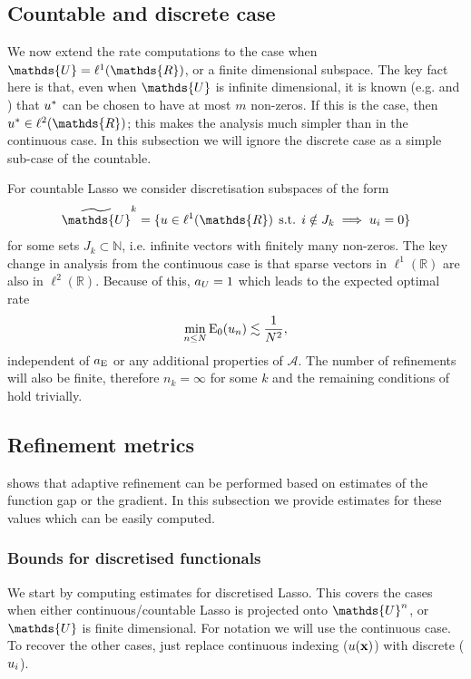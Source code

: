 \documentclass[10pt,a4paper,onecolumn]{article}
\numberwithin{equation}{section}
\let\F\mathds\let\C\mathcal\newcommand{\R}{\F{R}}\newcommand{\A}{\C{A}}
\newcommand{\op}[1]{\operatorname{#1}}\newcommand{\overtext}[2]{\stackrel{\text{#1}}{#2}}
\DeclareMathOperator{\st}{\;s.t.\;}\DeclareMathOperator{\as}{\;a.s.\;}\renewcommand{\epsilon}{\varepsilon}
\renewcommand{\vec}{\mathbf}
\newcommand{\UCmath}[1]{%
	\begingroup
	\ucmathlist\uppercase\expandafter{#1}%
	\endgroup
}
\newcommand{\ucmathlist}{%
	\def\alpha{\mathrm{A}}%
	\def\beta{\mathrm{B}}%
	\let\gamma=\Gamma
	\let\delta=\Delta
	\def\epsilon{\mathrm{E}}%
	\def\varepsilon{\mathrm{E}}%
	\def\zeta{\mathrm{Z}}%
	\def\eta{\mathrm{H}}%
	\let\theta=\Theta
	\let\vartheta=\Theta
	\def\iota{\mathrm{I}}%
	\def\kappa{\mathrm{K}}%
	\let\lambda=\Lambda
	\def\mu{\mathrm{M}}%
	\def\nu{\mathrm{N}}%
	\let\xi=\Xi
	\let\pi=\Pi
	\let\varpi=\Pi
	\def\rho{\mathrm{P}}%
	\def\varrho{\mathrm{P}}%
	\let\sigma=\Sigma
	\def\tau{\mathrm{T}}%
	\let\upsilon=\Upsilon
	\let\phi=\Phi
	\let\varphi=\Phi
	\def\chi{\mathrm{X}}%
	\let\psi=\Psi
	\let\omega=\Omega
}
\newcommand{\caps}[1]{\UCmath{#1}}
\newcommand*{\Func}[1]{%
	\IfEqCase{#1}{%
		{0}{\op{E}}%
		{1}{\op{F}}%
		{2}{\op{G}}%
		{3}{\op{H}}%
	}[\op{F}#1]%
}
\newcommand*{\varf}[1]{%
	\IfEqCase{#1}{%
		{0}{u}%
		{1}{v}%
		{2}{w}%
	}[u#1]%
}
\newcommand*{\spcf}[1]{%
	\IfEqCase{#1}{%
		{0}{\F{U}}%
		{1}{\F{V}}%
		{2}{\F{W}}%
	}[\F{U}#1]%
}
\newcommand*{\varx}[1]{%
	\IfEqCase{#1}{%
		{0}{x}%
		{1}{y}%
		{2}{z}%
		{3}{r}%
	}[x#1]%
}
\newcommand*{\vars}[1]{%
	\IfEqCase{#1}{%
		{0}{\alpha}%
		{1}{\beta}%
		{2}{\gamma}%
		{3}{a}%
		{4}{b}%
		{5}{c}%
	}[k#1]%
}
\newcommand*{\Varx}[1]{\caps{\varx{#1}}}
\newcommand*{\Varf}[1]{\caps{\varf{#1}}}
\newcommand*{\vvarx}[1]{\vec{\varx{#1}}}\newcommand*{\vVarx}[1]{\vec{\Varx{#1}}}
\begin{document}
\subsection{Countable and discrete case}
We now extend the rate computations to the case when $\spcf0=\ell^1(\R)$, or a finite dimensional subspace. The key fact here is that, even when $\spcf0$ is infinite dimensional, it is known (e.g. \cite[Theorem 2]{Unser2016} and \cite[Corollary 2]{Boyer2019}) that $\varf0^*$ can be chosen to have at most $m$ non-zeros. If this is the case, then $\varf0^*\in \ell^2(\R)$; this makes the analysis much simpler than in the continuous case. In this subsection we will ignore the discrete case as a simple sub-case of the countable.

For countable Lasso we consider discretisation subspaces of the form 
$$\tilde{\spcf0}^k = \{\varf0\in \ell^1(\R) \st i\notin J_k\implies \varf0_i=0\}$$ for some sets $J_k\subset\F N$, i.e. infinite vectors with finitely many non-zeros. The key change in analysis from the continuous case is that sparse vectors in $\ell^1(\R)$ are also in $\ell^2(\R)$. Because of this, $\vars3_{\Varf0}=1$ which leads to the expected optimal rate
$$\min_{n\leq N} \Func0_0(\varf0_n) \lesssim \frac{1}{N^2},$$
independent of $\vars3_{\Func0}$ or any additional properties of $\A$. The number of refinements will also be finite, therefore $n_k=\infty$ for some $k$ and the remaining conditions of  hold trivially.

\subsection{Refinement metrics}\label{sec:ca: Lasso gap and gradient}
 shows that adaptive refinement can be performed based on estimates of the function gap or the gradient. In this subsection we provide estimates for these values which can be easily computed.

\subsubsection{Bounds for discretised functionals}\label{sec:ca: bound discrete}
We start by computing estimates for discretised Lasso. This covers the cases when either continuous/countable Lasso is projected onto $\spcf0^n$, or $\spcf0$ is finite dimensional. For notation we will use the continuous case. To recover the other cases, just replace continuous indexing ($\varf0(\vvarx0)$) with discrete ($\varf0_i$).
\end{document}
